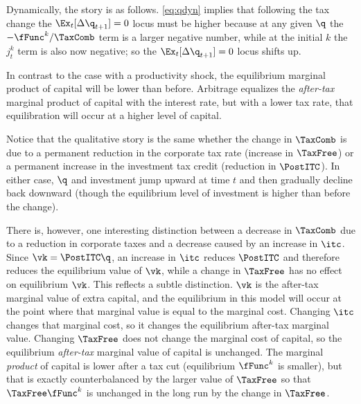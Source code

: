 \documentclass[headings=optiontotocandhead,toc=flat]{handout}
\begin{document}
Dynamically, the story is as follows.  \eqref{eq:qdyn} implies that
following the tax change the $\Ex_{t}[\Delta \q_{t+1}] = 0$ locus must be higher
because at any given $\q$ the $- \fFunc^{k}/\TaxComb$ term is a larger
negative number, while at the initial $k$ the $j^{k}_{t}$ term is also now negative; so the $\Ex_{t}[\Delta \q_{t+1}]=0$ locus shifts up.

In contrast to the case with a productivity shock, the equilibrium marginal product
of capital will be lower than before.  Arbitrage equalizes the {\it after-tax} marginal
product of capital with the interest rate, but with a lower tax rate, that equilibration will occur
at a higher level of capital.

Notice that the qualitative story is the same whether the change in $\TaxComb$ is
due to a permanent reduction in the corporate tax rate (increase in $\TaxFree$) or a permanent
increase in the investment tax credit (reduction in $\PostITC$).  In either case, $\q$
and investment jump upward at time $t$ and then gradually decline back downward (though the equilibrium level of investment is higher than before the change).


There is, however, one interesting distinction between a decrease in
$\TaxComb$ due to a reduction in corporate taxes and a decrease caused
by an increase in $\itc$.  Since $\vk=\PostITC\q$, an increase in
$\itc$ reduces $\PostITC$ and therefore reduces the equilibrium value
of $\vk$, while a change in $\TaxFree$ has no effect on
equilibrium $\vk$.  This reflects a subtle distinction.  $\vk$
is the after-tax marginal value of extra capital, and the equilibrium
in this model will occur at the point where that marginal value is
equal to the marginal cost.  Changing $\itc$ changes that marginal
cost, so it changes the equilibrium after-tax marginal value.
Changing $\TaxFree$ does not change the marginal cost of capital, so
the equilibrium {\it after-tax} marginal value of capital is
unchanged.  The marginal {\it product} of capital is lower after a tax
cut (equilibrium $\fFunc^{k}$ is smaller), but that is exactly
counterbalanced by the larger value of $\TaxFree$ so that 
$\TaxFree\fFunc^{k}$ is unchanged in the long run by the change in
$\TaxFree$.
\end{document}
